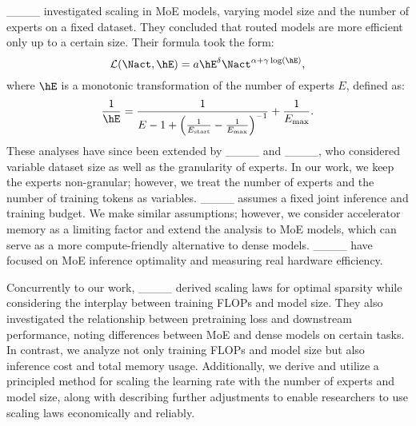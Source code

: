 ____ investigated scaling in MoE models, varying model size and the number of experts on a fixed dataset. They concluded that routed models are more efficient only up to a certain size. Their formula took the form:
\begin{equation} \label{eq:scaling_law_clark}
  \mathcal{L}(\Nact, \hE) = a\hE^{\delta}\Nact^{\alpha + \gamma \log(\hE)},
\end{equation}
where $\hE$ is a monotonic transformation of the number of experts $E$, defined as:
\begin{equation} \label{eq:e_transformation}
    \frac{1}{\hE} = \frac{1}{E - 1 + \left(\frac{1}{E_{\text{start}}} - \frac{1}{E_{\text{max}}}\right)^{-1}} + \frac{1}{E_{\text{max}}}.
\end{equation}
These analyses have since been extended by ____ and ____, who considered variable dataset size as well as the granularity of experts. In our work, we keep the experts non-granular; however, we treat the number of experts and the number of training tokens as variables. ____ assumes a fixed joint inference and training budget. We make similar assumptions; however, we consider accelerator memory as a limiting factor and extend the analysis to MoE models, which can serve as a more compute-friendly alternative to dense models. ____ have focused on MoE inference optimality and measuring real hardware efficiency.

Concurrently to our work, ____ derived scaling laws for optimal sparsity while considering the interplay between training FLOPs and model size. They also investigated the relationship between pretraining loss and downstream performance, noting differences between MoE and dense models on certain tasks. In contrast, we analyze not only training FLOPs and model size but also inference cost and total memory usage. Additionally, we derive and utilize a principled method for scaling the learning rate with the number of experts and model size, along with describing further adjustments to enable researchers to use scaling laws economically and reliably.



















\newpage